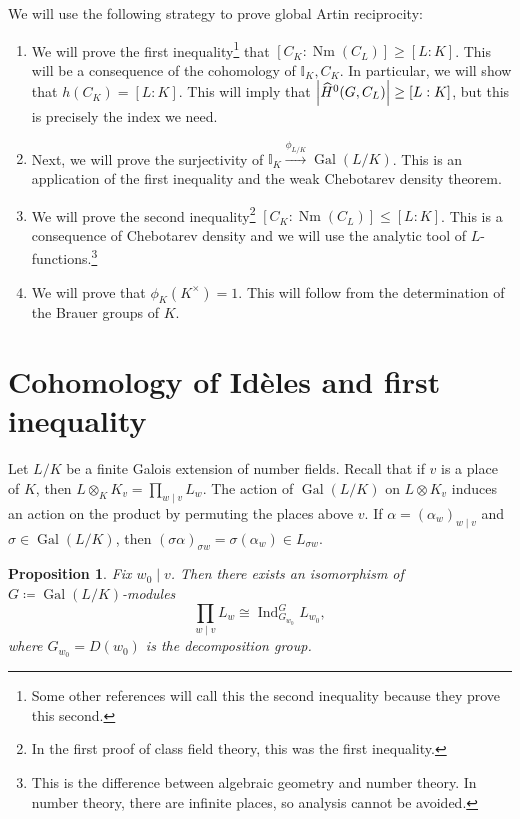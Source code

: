 \documentclass[leqno, openany]{memoir}
\newtheorem{prop}[thm]{Proposition}
\theoremstyle{definition}
\theoremstyle{remark}
\theoremstyle{plain}
\theoremstyle{definition}
\theoremstyle{remark}
\newcommand{\I}{\mathbb{I}}
\newcommand{\wh}[1]{\widehat{#1}}
\DeclareMathOperator{\Gal}{Gal}
\DeclareMathOperator{\Ind}{Ind}
\DeclareMathOperator{\Nm}{Nm}
\begin{document}
We will use the following strategy to prove global Artin reciprocity:
\begin{enumerate} \item We will prove the first inequality\footnote{Some other
    references will call this the second inequality because they prove this
second.} that $[C_K:\Nm(C_L)] \geq [L:K]$. This will be a consequence of the
cohomology of $\I_K, C_K$. In particular, we will show that $h(C_K) = [L:K]$.
This will imply that $\abs{\wh{H}^0(G, C_L)} \geq [L:K]$, but this is precisely
the index we need.  \item Next, we will prove the surjectivity of $\I_K
\xrightarrow{\phi_{L/K}} \Gal(L/K)$. This is an application of the first
inequality and the weak Chebotarev density theorem.  \item We will prove the
second inequality\footnote{In the first proof of class field theory, this was
the first inequality.} $[C_K : \Nm(C_L)] \leq [L:K]$. This is a consequence of
Chebotarev density and we will use the analytic tool of
$L$-functions.\footnote{This is the difference between algebraic geometry and
number theory. In number theory, there are infinite places, so analysis cannot
be avoided.} \item We will prove that $\phi_K(K^{\times}) = 1$. This will
follow from the determination of the Brauer groups of $K$.  \end{enumerate}

\section{Cohomology of Id\`eles and first inequality}%
\label{sec:cohomology_of_id`eles}

Let $L/K$ be a finite Galois extension of number fields. Recall that if $v$ is
a place of $K$, then $L \otimes_K K_v = \prod_{w \mid v} L_w$. The action of
$\Gal(L/K)$ on $L \otimes K_v$ induces an action on the product by permuting
the places above $v$. If $\alpha = {(\alpha_w)}_{w \mid v}$ and $\sigma \in
\Gal(L/K)$, then ${(\sigma \alpha)}_{\sigma w} = \sigma (\alpha_w) \in
L_{\sigma w}$.

\begin{prop} Fix $w_0 \mid v$. Then there exists an isomorphism of $G \coloneqq
    \Gal(L/K)$-modules \[ \prod_{w \mid v} L_w \cong \Ind_{G_{w_0}}^G L_{w_0},
    \] where $G_{w_0} = D(w_0)$ is the decomposition group.  \end{prop}
\end{document}
